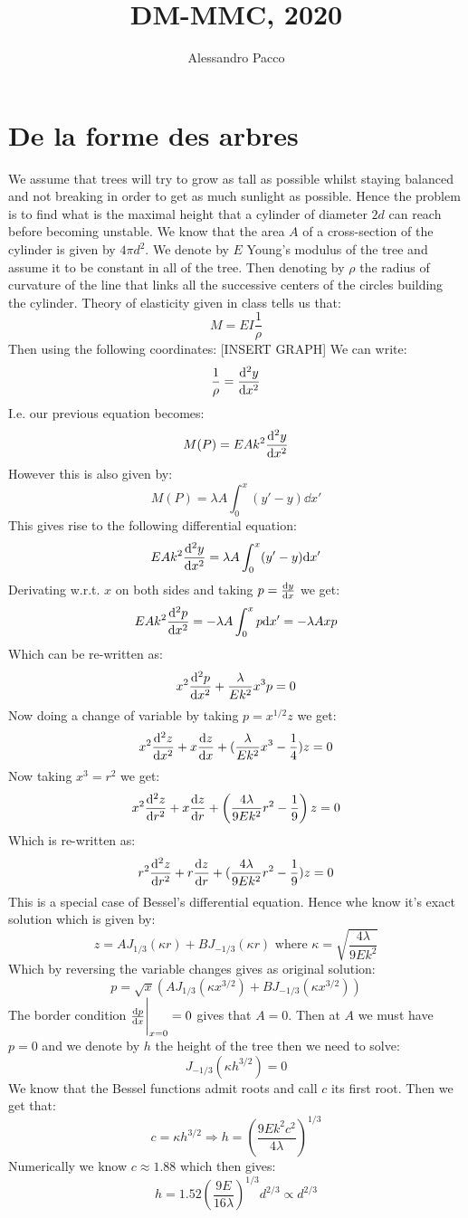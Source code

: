 \documentclass[10pt,a4paper]{book}
\author{Alessandro Pacco}
\title{DM-MMC, 2020}
\begin{document}
\maketitle

\tableofcontents

\section*{De la forme des arbres}
We assume that trees will try to grow as tall as possible whilst staying balanced and not breaking in order to get as much sunlight as possible. Hence the problem is to find what is the maximal height that a cylinder of diameter $2d$ can reach before becoming unstable. We know that the area $A$ of a cross-section of the cylinder is given by $4 \pi d^2$.  We denote by $E$ Young's modulus of the tree and assume it to be constant in all of the tree. Then  denoting by $\rho$ the radius of curvature of the line  that links all the successive centers of the circles building the cylinder. Theory of elasticity given in class tells us that:
\[
M = E I \frac{1}{\rho}
\]
Then using the following coordinates: [INSERT GRAPH]
We can write:
\[
\frac{1}{\rho} = \dv[2]{y}{x}
\]
I.e. our previous equation becomes:
\[
M(P) = EA k^2 \dv[2]{y}{x}
\]
However this is also given by:
\[
M(P) = \lambda A \int_0^x (y' - y) \dd x'
\]
This gives rise to the following differential equation:
\[
EA k^2 \dv[2]{y}{x} = \lambda A \int_0^x (y' - y) \dd x'
\]
Derivating w.r.t. $x$ on both sides and taking $p = \dv{y}{x}$ we get:
\[
E A k^2 \dv[2]{p}{x} = - \lambda A \int_0^x p \dd x' = - \lambda A x p
\]
Which can be re-written as:
\[
x^2 \dv[2]{p}{x} + \frac{\lambda}{E k^2}  x^3 p = 0 
\]
Now doing a change of variable by taking $p = x^{1/2} z$ we get:
\[
x^2 \dv[2]{z}{x} + x \dv{z}{x} + (\frac{\lambda}{E k^2} x^3 - \frac{1}{4}) z = 0
\]
Now taking $x^3 = r^2$ we get:
\[
x^2 \dv[2]{z}{r} + x \dv{z}{r} + \left(\frac{4 \lambda}{9 E k^2} r^2 - \frac{1}{9}\right) z = 0
\]
Which is re-written as:
\[
r^2 \dv[2]{z}{r} + r \dv{z}{r} + (\frac{4 \lambda}{9 E k^2} r^2 - \frac{1}{9}) z = 0
\]
This is a special case of Bessel's differential equation. Hence whe know it's exact solution which is given by:
\[
z = A J_{1/3}(\kappa r) + B J_{-1/3} (\kappa r) \text{ where } \kappa = \sqrt{\frac{4 \lambda}{9 E k^2}}
\]
Which by reversing the variable changes gives as original solution:
\[
p = \sqrt{x} \left(A J_{1/3}(\kappa x^{3/2}) + B J_{-1/3} (\kappa x^{3/2}) \right)
\]
The border condition $\dv{p}{x}\Bigg|_{x = 0} = 0$ gives that $A = 0$. Then at $A$ we must have $p = 0$ and we denote by $h$ the height of the tree then we need to solve:
\[
J_{-1/3}(\kappa h^{3/2}) = 0
\]
We know that the Bessel functions admit roots and call $c$ its first root. Then we get that:
\[
c = \kappa h^{3/2} \Rightarrow h = \left(\frac{9 E k^2 c^2}{4 \lambda}\right)^{1/3}
\]
Numerically we know $c \approx 1.88$ which then gives:
\[
h = 1.52 \left(\frac{9 E}{16 \lambda} \right)^{1/3} d^{2/3} \propto d^{2/3}
\]
\end{document}
